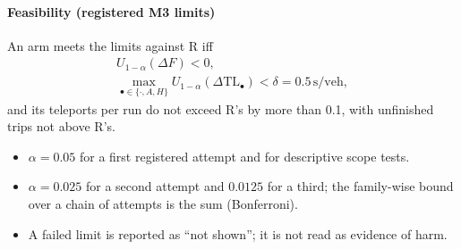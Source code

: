 \paragraph{Feasibility (registered M3 limits)} An arm meets the limits against R iff
\begin{gather}
U_{1-\alpha}(\Delta F)<0,\\
\max_{\bullet\in\{\cdot,A,H\}}U_{1-\alpha}(\Delta\mathrm{TL}_\bullet)<\delta=0.5\,\mathrm{s/veh},
\end{gather}
and its teleports per run do not exceed R's by more than 0.1, with unfinished trips not above R's.
\begin{itemize}\setlength\itemsep{0pt}
\item $\alpha=0.05$ for a first registered attempt and for descriptive scope tests.
\item $\alpha=0.025$ for a second attempt and $0.0125$ for a third; the family-wise bound over a chain of attempts is the sum (Bonferroni).
\item A failed limit is reported as ``not shown''; it is not read as evidence of harm.
\end{itemize}

